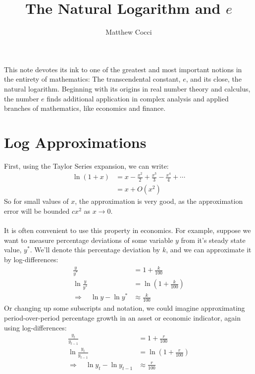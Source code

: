 \documentclass[a4paper,12pt]{scrartcl}
\author{Matthew Cocci}
\title{The Natural Logarithm and $e$}
\date{}
\begin{document}
\maketitle


This note devotes its ink to one of the greatest and most important
notions in the entirety of mathematics: The transcendental constant,
$e$, and its close, the natural logarithm.
Beginning with its origins in real number theory and
calculus, the number $e$ finds additional application in complex
analysis and applied branches of mathematics, like economics and
finance.  

\section{Log Approximations}

First, using the Taylor Series expansion, we can write:
\begin{align*}
   \ln(1+x) &= x - \frac{x^2}{2} + \frac{x^3}{3} - \frac{x^4}{4} 
      + \cdots \\
   &= x + O(x^2)
\end{align*}
So for small values of $x$, the approximation is very good, as
the approximation error will be bounded $c x^2$ as $x \rightarrow 0$.
\\
\\
It is often convenient to use this property in
economics.  For example, suppose we want to measure percentage 
deviations of some variable $y$ from it's steady state value, $y^*$.
We'll denote this percentage deviation by $k$, and 
we can approximate it by log-differences:
\begin{align*}
   \frac{y}{y^*} &= 1 + \frac{k}{100} \\
   \ln \frac{y}{y^*} &= \ln\left(1 + \frac{k}{100}\right) \\
   \Rightarrow \quad \ln y - \ln y^* &\approx \frac{k}{100}
\end{align*}
Or changing up some subscripts and notation, we could imagine 
approximating period-over-period percentage growth in an asset or 
economic indicator, again using log-differences:
\begin{align*}
   \frac{y_t}{y_{t-1}} &= 1 + \frac{r}{100} \\
   \ln \frac{y_t}{y_{t-1}} &= \ln\left(1 + \frac{r}{100}\right) \\
   \Rightarrow \quad \ln y_t - \ln y_{t-1} &\approx \frac{r}{100}
\end{align*}






% 
\end{document}
